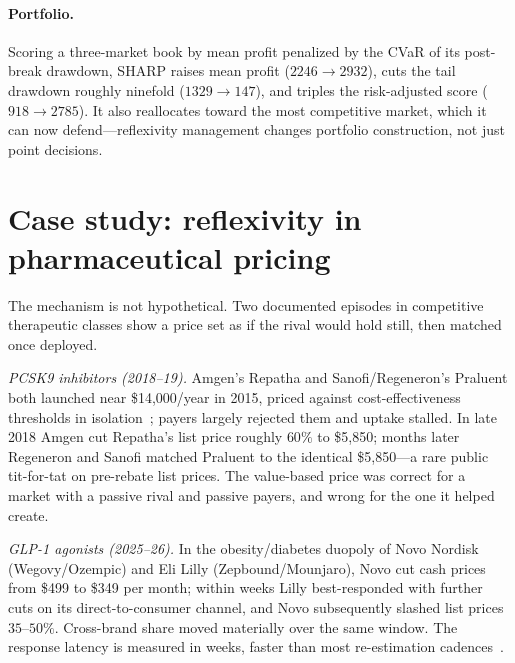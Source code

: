 \documentclass[11pt]{article}
\begin{document}
\paragraph{Portfolio.} Scoring a three-market book by mean profit penalized by the CVaR of its
post-break drawdown, SHARP raises mean profit ($2246\to2932$), cuts the tail drawdown roughly
ninefold ($1329\to147$), and triples the risk-adjusted score ($918\to2785$). It also reallocates
toward the most competitive market, which it can now defend---reflexivity management changes
portfolio construction, not just point decisions.

\section{Case study: reflexivity in pharmaceutical pricing}\label{sec:pharma}
The mechanism is not hypothetical. Two documented episodes in competitive therapeutic classes
show a price set as if the rival would hold still, then matched once deployed.

\emph{PCSK9 inhibitors (2018--19).} Amgen's Repatha and Sanofi/Regeneron's Praluent both launched
near \$14{,}000/year in 2015, priced against cost-effectiveness thresholds in isolation~\cite{pcsk9}; payers
largely rejected them and uptake stalled. In late 2018 Amgen cut Repatha's list price roughly
$60\%$ to \$5{,}850; months later Regeneron and Sanofi matched Praluent to the identical
\$5{,}850---a rare public tit-for-tat on pre-rebate list prices. The value-based price was correct
for a market with a passive rival and passive payers, and wrong for the one it helped create.

\emph{GLP-1 agonists (2025--26).} In the obesity/diabetes duopoly of Novo Nordisk
(Wegovy/Ozempic) and Eli Lilly (Zepbound/Mounjaro), Novo cut cash prices from \$499 to \$349 per
month; within weeks Lilly best-responded with further cuts on its direct-to-consumer channel, and
Novo subsequently slashed list prices $35$--$50\%$. Cross-brand share moved materially over the
same window. The response latency is measured in weeks, faster than most re-estimation cadences~\cite{glp1}.
\end{document}
